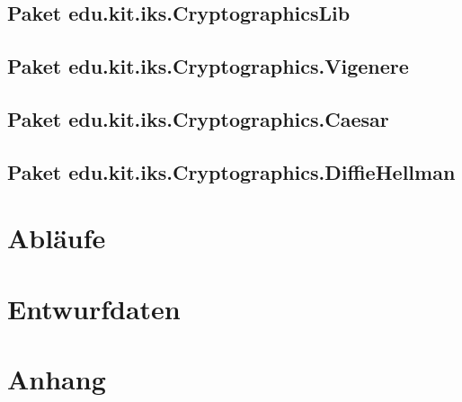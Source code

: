 \documentclass{article}
\begin{document}
\subsection{Paket edu.kit.iks.CryptographicsLib}
\subsection{Paket edu.kit.iks.Cryptographics.Vigenere}
\subsection{Paket edu.kit.iks.Cryptographics.Caesar}
\subsection{Paket edu.kit.iks.Cryptographics.DiffieHellman}

\section{Abläufe}

\section{Entwurfdaten}

\section{Anhang}
\glsaddall
\printglossary[numberedsection, style=altlist]
\end{document}
